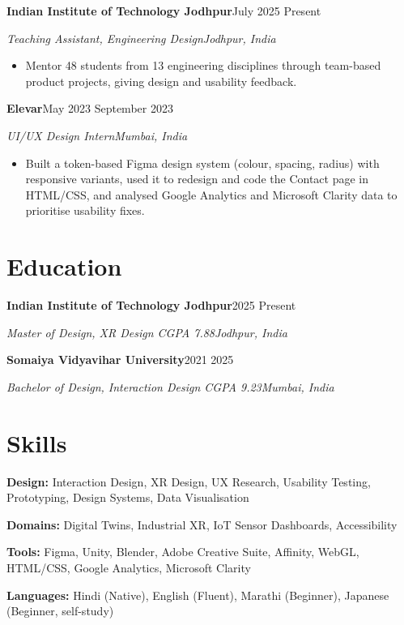 \documentclass[a4paper,10pt]{article}
\newlength{\entrygap}\setlength{\entrygap}{9pt}  %
\newcommand{\entry}[4]{%
    {\color{ink}\textbf{#1}}\hfill{\color{muted}#2}\par
    \textit{#3}\hfill{\color{muted}\textit{#4}}\par
}
\newcommand{\sep}{\unskip\enspace\textbar\enspace\ignorespaces}
\begin{document}
\entry{Indian Institute of Technology Jodhpur}{July 2025 \textendash{} Present}{Teaching Assistant, Engineering Design}{Jodhpur, India}
\begin{itemize}
    \item Mentor 48 students from 13 engineering disciplines through team-based product projects, giving design and usability feedback.
\end{itemize}
\vspace{\entrygap}

\entry{Elevar}{May 2023 \textendash{} September 2023}{UI/UX Design Intern}{Mumbai, India}
\begin{itemize}
    \item Built a token-based Figma design system (colour, spacing, radius) with responsive variants, used it to redesign and code the Contact page in HTML/CSS, and analysed Google Analytics and Microsoft Clarity data to prioritise usability fixes.
\end{itemize}

\section{Education}

\entry{Indian Institute of Technology Jodhpur}{2025 \textendash{} Present}{Master of Design, XR Design \sep CGPA 7.88}{Jodhpur, India}
\vspace{\entrygap}

\entry{Somaiya Vidyavihar University}{2021 \textendash{} 2025}{Bachelor of Design, Interaction Design \sep CGPA 9.23}{Mumbai, India}

\section{Skills}

\textbf{\color{ink}Design:} Interaction Design, XR Design, UX Research, Usability Testing, Prototyping, Design Systems, Data Visualisation\par
\vspace{4pt}
\textbf{\color{ink}Domains:} Digital Twins, Industrial XR, IoT Sensor Dashboards, Accessibility\par
\vspace{4pt}
\textbf{\color{ink}Tools:} Figma, Unity, Blender, Adobe Creative Suite, Affinity, WebGL, HTML/CSS, Google Analytics, Microsoft Clarity\par
\vspace{4pt}
\textbf{\color{ink}Languages:} Hindi (Native), English (Fluent), Marathi (Beginner), Japanese (Beginner, self-study)\par
\end{document}
